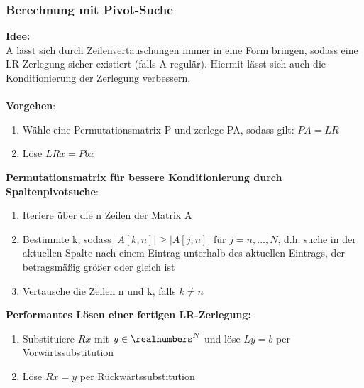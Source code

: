 \subsubsection{Berechnung mit Pivot-Suche}%
\label{zerl:ssub:berechnung-pivot}
\textbf{Idee:}\\A lässt sich durch Zeilenvertauschungen immer in eine Form bringen, sodass eine LR-Zerlegung sicher existiert (falls A regulär). Hiermit lässt sich auch die Konditionierung der Zerlegung verbessern.\\\\
\textbf{Vorgehen}:
\begin{enumerate}
	\item Wähle eine Permutationsmatrix P und zerlege PA, sodass gilt: $PA = LR$
	\item Löse $LRx = Pbx$
\end{enumerate}
\textbf{Permutationsmatrix für bessere Konditionierung durch Spaltenpivotsuche}:
\begin{enumerate}
	\item Iteriere über die n Zeilen der Matrix A
	\item Bestimmte k, sodass $|A[k, n]| \geq |A[j, n]|$ für $j = n, ..., N$, d.h. suche in der aktuellen Spalte nach einem Eintrag unterhalb des aktuellen Eintrags, der betragsmäßig größer oder gleich ist
	\item Vertausche die Zeilen n und k, falls $k \neq n$
\end{enumerate}
\textbf{Performantes Lösen einer fertigen LR-Zerlegung:}
\begin{enumerate}
	\item Substituiere $Rx$ mit $y\in\realnumbers^N$ und löse $Ly = b$ per Vorwärtssubstitution
	\item Löse $Rx = y$ per Rückwärtssubstitution
\end{enumerate}
